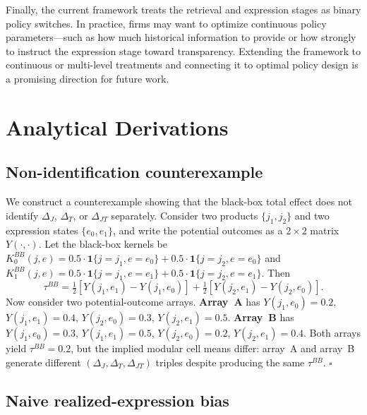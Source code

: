 \documentclass[11pt]{article}
\newcommand{\Y}{Y}
\newcommand{\dR}{\Delta_J}
\newcommand{\dP}{\Delta_T}
\newcommand{\dRP}{\Delta_{JT}}
\newcommand{\dtotal}{\tau^{BB}}
\newcommand{\KOS}{K^{BB}}
\begin{document}
Finally, the current framework treats the retrieval and expression stages as binary policy switches. In practice, firms may want to optimize continuous policy parameters---such as how much historical information to provide or how strongly to instruct the expression stage toward transparency. Extending the framework to continuous or multi-level treatments and connecting it to optimal policy design is a promising direction for future work.

\bigskip



\newpage

\appendix

\section{Analytical Derivations}\label{section:proofs}

\subsection{Non-identification counterexample}\label{section:proof-nonid}

We construct a counterexample showing that the black-box total effect does not identify $\dR$, $\dP$, or $\dRP$ separately. Consider two products $\{j_1, j_2\}$ and two expression states $\{e_0, e_1\}$, and write the potential outcomes as a $2 \times 2$ matrix $\Y(\cdot, \cdot)$. Let the black-box kernels be $\KOS_0(j, e) = 0.5 \cdot \mathbf{1}\{j = j_1, e = e_0\} + 0.5 \cdot \mathbf{1}\{j = j_2, e = e_0\}$ and $\KOS_1(j, e) = 0.5 \cdot \mathbf{1}\{j = j_1, e = e_1\} + 0.5 \cdot \mathbf{1}\{j = j_2, e = e_1\}$. Then
\[
\dtotal = \tfrac{1}{2}\!\left[\Y(j_1, e_1) - \Y(j_1, e_0)\right] + \tfrac{1}{2}\!\left[\Y(j_2, e_1) - \Y(j_2, e_0)\right].
\]
Now consider two potential-outcome arrays. \textbf{Array~A} has $\Y(j_1, e_0) = 0.2$, $\Y(j_1, e_1) = 0.4$, $\Y(j_2, e_0) = 0.3$, $\Y(j_2, e_1) = 0.5$. \textbf{Array~B} has $\Y(j_1, e_0) = 0.3$, $\Y(j_1, e_1) = 0.5$, $\Y(j_2, e_0) = 0.2$, $\Y(j_2, e_1) = 0.4$. Both arrays yield $\dtotal = 0.2$, but the implied modular cell means differ: array~A and array~B generate different $(\dR, \dP, \dRP)$ triples despite producing the same $\dtotal$. $\square$

\subsection{Naive realized-expression bias}\label{section:proof-naive}
\end{document}
